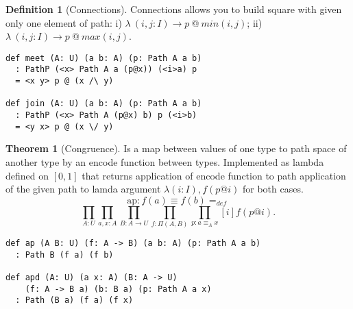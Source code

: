 \documentclass{article}
\theoremstyle{definition}
\newtheorem{definition}{Definition}
\newtheorem{theorem}{Theorem}
\begin{document}
\begin{definition}[Connections]
Connections allows you to build square with given only one element of path:
i) $\lambda\ (i,j: I) \rightarrow p\ @\ min(i,j)$;
ii) $\lambda\ (i,j:I) \rightarrow p\ @\ max(i,j)$.
\begin{center}
\end{center}
\begin{lstlisting}[mathescape=true]
def meet (A: U) (a b: A) (p: Path A a b)
  : PathP (<x> Path A a (p@x)) (<i>a) p
  = <x y> p @ (x /\ y)

def join (A: U) (a b: A) (p: Path A a b)
  : PathP (<x> Path A (p@x) b) p (<i>b)
  = <y x> p @ (x \/ y)
\end{lstlisting}
\end{definition}

\begin{theorem}[Congruence]
Is a map between values of one type
to path space of another type by an encode function between types.
Implemented as lambda defined on $[0,1]$ that returns
application of encode function to path application of
the given path to lamda argument $ \lambda (i:I), f (p @ i)$
for both cases.
$$
   \mathrm{ap} : f(a)\equiv f(b) =_{def}
$$
$$
   \prod_{A:U}\prod_{a,x:A}\prod_{B:A\rightarrow U}\prod_{f: \Pi(A,B)}\prod_{p:a\equiv_A x}[i] f(p@i).
$$
\begin{lstlisting}
def ap (A B: U) (f: A -> B) (a b: A) (p: Path A a b)
  : Path B (f a) (f b)

def apd (A: U) (a x: A) (B: A -> U)
    (f: A -> B a) (b: B a) (p: Path A a x)
  : Path (B a) (f a) (f x)
\end{lstlisting}
\end{theorem}
\end{document}
